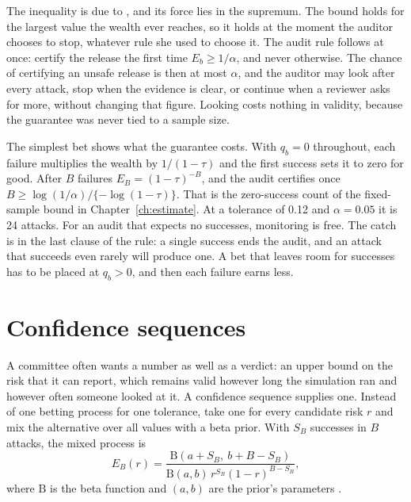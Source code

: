 The inequality is due to \citet{ville1939}, and its force lies in the supremum.
The bound holds for the largest value the wealth ever reaches, so it holds at the
moment the auditor chooses to stop, whatever rule she used to choose it. The audit
rule follows at once: certify the release the first time $E_b \ge 1/\alpha$, and
never otherwise. The chance of certifying an unsafe release is then at most
$\alpha$, and the auditor may look after every attack, stop when the evidence is
clear, or continue when a reviewer asks for more, without changing that figure.
Looking costs nothing in validity, because the guarantee was never tied to a
sample size.

The simplest bet shows what the guarantee costs. With $q_b = 0$ throughout, each
failure multiplies the wealth by $1/(1-\tau)$ and the first success sets it to zero
for good. After $B$ failures $E_B = (1-\tau)^{-B}$, and the audit certifies once
$B \ge \log(1/\alpha)/\{-\log(1-\tau)\}$. That is the zero-success count of the
fixed-sample bound in Chapter~\ref{ch:estimate}. At a tolerance of 0.12 and
$\alpha = 0.05$ it is 24 attacks.
For an audit that expects no successes, monitoring is free. The catch is in the
last clause of the rule: a single success ends the audit, and an attack that
succeeds even rarely will produce one. A bet that leaves room for successes has to
be placed at $q_b > 0$, and then each failure earns less.

\section{Confidence sequences}\label{c06:sec-cs}

A committee often wants a number as well as a verdict: an upper bound on the risk
that it can report, which remains valid however long the simulation ran and however
often someone looked at it. A confidence sequence supplies one. Instead of one
betting process for one tolerance, take one for every candidate risk $r$ and mix the
alternative over all values with a beta prior. With $S_B$ successes in $B$ attacks,
the mixed process is
\begin{equation}\label{c06:eq-mixture}
E_B(r) = \frac{\mathrm{B}(a + S_B,\ b + B - S_B)}
{\mathrm{B}(a,b)\, r^{S_B} (1-r)^{B - S_B}} ,
\end{equation}
where $\mathrm{B}$ is the beta function and $(a,b)$ are the prior's parameters
\citep{howard2021,ramdas2023}.

